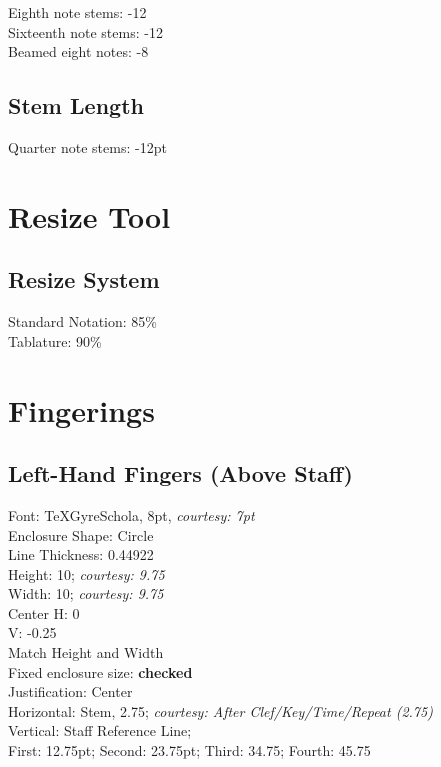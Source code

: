 \documentclass[]{tufte-book} %
\begin{document}
Eighth note stems: -12\\
Sixteenth note stems: -12\\
Beamed eight notes: -8

\section{Stem Length}
\label{sec:stem-length}

Quarter note stems: -12pt

\chapter{Resize Tool}
\label{sec:resize-tool}

\section{Resize System}
\label{sec:resize-system}

Standard Notation: 85\%\\

\noindent Tablature: 90\%

\chapter{Fingerings}
\label{sec:fingerings}

\section{Left-Hand Fingers (Above Staff)}
\label{sec:left-hand-fingers}

Font: TeXGyreSchola, 8pt, \emph{courtesy: 7pt}\\
Enclosure Shape: Circle\\
Line Thickness: 0.44922\\
Height: 10; \emph{courtesy: 9.75}\\
Width: 10; \emph{courtesy: 9.75}\\
Center H: 0\\
V: -0.25\\
Match Height and Width\\
Fixed enclosure size: \textbf{checked}\\
Justification: Center\\
Horizontal: Stem, 2.75; \emph{courtesy: After Clef/Key/Time/Repeat (2.75)}\\
Vertical: Staff Reference Line;\\
First: 12.75pt; Second: 23.75pt; Third: 34.75; Fourth: 45.75
\end{document}
